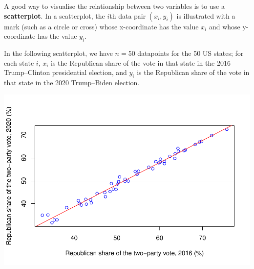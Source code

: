 \documentclass[
  a4paper,
]{book}
\newenvironment{Shaded}{\begin{snugshade}}{\end{snugshade}}
\newcommand{\AttributeTok}[1]{\textcolor[rgb]{0.13,0.29,0.53}{#1}}
\newcommand{\DecValTok}[1]{\textcolor[rgb]{0.00,0.00,0.81}{#1}}
\newcommand{\FloatTok}[1]{\textcolor[rgb]{0.00,0.00,0.81}{#1}}
\newcommand{\FunctionTok}[1]{\textcolor[rgb]{0.13,0.29,0.53}{\textbf{#1}}}
\newcommand{\NormalTok}[1]{#1}
\newcommand{\OtherTok}[1]{\textcolor[rgb]{0.56,0.35,0.01}{#1}}
\newcommand{\SpecialCharTok}[1]{\textcolor[rgb]{0.81,0.36,0.00}{\textbf{#1}}}
\newcommand{\StringTok}[1]{\textcolor[rgb]{0.31,0.60,0.02}{#1}}
\theoremstyle{definition}
\theoremstyle{definition}
\theoremstyle{definition}
\theoremstyle{definition}
\theoremstyle{remark}
\begin{document}
A good way to visualise the relationship between two variables is to use a \textbf{scatterplot}. In a scatterplot, the \(i\)th data pair \((x_i, y_i)\) is illustrated with a mark (such as a circle or cross) whose x-coordinate has the value \(x_i\) and whose y-coordinate has the value \(y_i\).

In the following scatterplot, we have \(n = 50\) datapoints for the 50 US states; for each state \(i\), \(x_i\) is the Republican share of the vote in that state in the 2016 Trump--Clinton presidential election, and \(y_i\) is the Republican share of the vote in that state in the 2020 Trump--Biden election.

\begin{Shaded}
\end{Shaded}

\includegraphics{math1710_files/figure-latex/elections-1.pdf}
\end{document}
